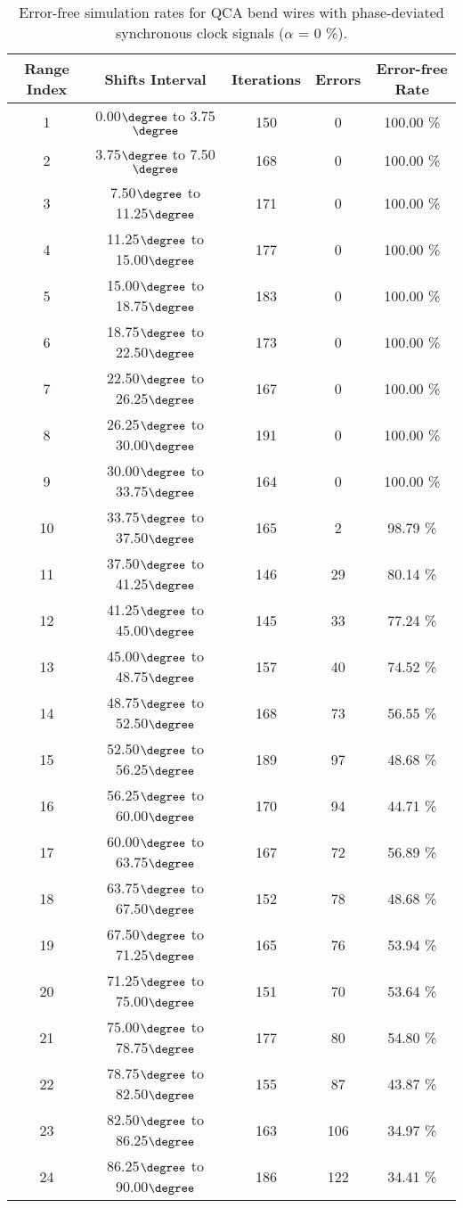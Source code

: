 \flushleft
\begin{table}[h]
\begin{center}
\caption{Error-free simulation rates for QCA bend wires with phase-deviated synchronous clock signals ($\alpha$ = 0 \%).}
\begin{tabular}{|c|c|c|c|c|}
\hline
\textbf{Range Index} & \textbf{Shifts Interval} & \textbf{Iterations} & \textbf{Errors} & \textbf{Error-free Rate} \\
\hline
1  &  0.00$\degree$ to  3.75$\degree$ & 150 &  0 & 100.00 \% \\
\hline
2  &  3.75$\degree$ to  7.50$\degree$ & 168 &  0 & 100.00 \% \\
\hline
3  &  7.50$\degree$ to 11.25$\degree$ & 171 &  0 & 100.00 \% \\
\hline
4  & 11.25$\degree$ to 15.00$\degree$ & 177 &  0 & 100.00 \% \\
\hline
5  & 15.00$\degree$ to 18.75$\degree$ & 183 &  0 & 100.00 \% \\
\hline
6  & 18.75$\degree$ to 22.50$\degree$ & 173 &  0 & 100.00 \% \\
\hline
7  & 22.50$\degree$ to 26.25$\degree$ & 167 &  0 & 100.00 \% \\
\hline
8  & 26.25$\degree$ to 30.00$\degree$ & 191 &  0 & 100.00 \% \\
\hline
9  & 30.00$\degree$ to 33.75$\degree$ & 164 &  0 & 100.00 \% \\
\hline
10 & 33.75$\degree$ to 37.50$\degree$ & 165 &  2 &  98.79 \% \\
\hline
11 & 37.50$\degree$ to 41.25$\degree$ & 146 & 29 &  80.14 \% \\
\hline
12 & 41.25$\degree$ to 45.00$\degree$ & 145 & 33 &  77.24 \% \\
\hline
13 & 45.00$\degree$ to 48.75$\degree$ & 157 & 40 &  74.52 \% \\
\hline
14 & 48.75$\degree$ to 52.50$\degree$ & 168 & 73 &  56.55 \% \\
\hline
15 & 52.50$\degree$ to 56.25$\degree$ & 189 & 97 &  48.68 \% \\
\hline
16 & 56.25$\degree$ to 60.00$\degree$ & 170 & 94 &  44.71 \% \\
\hline
17 & 60.00$\degree$ to 63.75$\degree$ & 167 & 72 &  56.89 \% \\
\hline
18 & 63.75$\degree$ to 67.50$\degree$ & 152 & 78 &  48.68 \% \\
\hline
19 & 67.50$\degree$ to 71.25$\degree$ & 165 & 76 &  53.94 \% \\
\hline
20 & 71.25$\degree$ to 75.00$\degree$ & 151 & 70 &  53.64 \% \\
\hline
21 & 75.00$\degree$ to 78.75$\degree$ & 177 & 80 &  54.80 \% \\
\hline
22 & 78.75$\degree$ to 82.50$\degree$ & 155 & 87 &  43.87 \% \\
\hline
23 & 82.50$\degree$ to 86.25$\degree$ & 163 & 106 &  34.97 \% \\
\hline
24 & 86.25$\degree$ to 90.00$\degree$ & 186 & 122 &  34.41 \% \\
\hline


\end{tabular}
\end{center}
\end{table}
